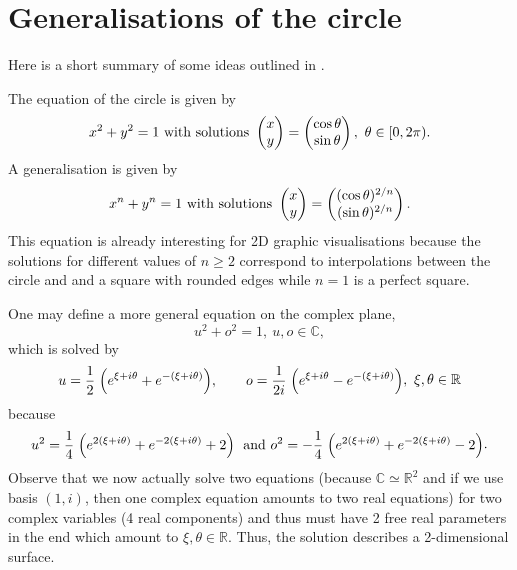 \section{Generalisations of the circle}

Here is a short summary of some ideas outlined in \cite{Hanson1994}.

The equation of the circle is given by
\begin{equation}
  x^2+y^2 = 1 \text{ with solutions }
  \begin{pmatrix}
    x\\
    y
  \end{pmatrix} =
  \begin{pmatrix}
    \cos \theta\\
    \sin \theta
  \end{pmatrix},~\theta \in [0,2\pi).
  \label{eq:circle}
\end{equation}
A generalisation is given by
\begin{equation}
  x^n+y^n = 1 \text{ with solutions }
  \begin{pmatrix}
    x\\
    y
  \end{pmatrix} =
  \begin{pmatrix}
    (\cos \theta)^{2/n}\\
  (\sin \theta)^{2/n}
\end{pmatrix}.
  \label{eq:generalRealCircle}
\end{equation}
This equation is already interesting for 2D graphic visualisations because
the solutions for different values of $n\ge 2$ correspond to interpolations between
the circle and and a square with rounded edges while $n=1$ is a perfect square.

One may define a more general equation on the complex plane,
\begin{equation}
  u^2+o^2 = 1,~u,o\in\mathbb{C},
\end{equation}
which is solved by
\begin{equation}
  \begin{split}
    u = \frac{1}{2}\mathrel{ \left(e^{\xi+i\theta}+e^{-(\xi+i\theta)}\right) },\qquad
  o = \frac{1}{2i}\mathrel{ \left(e^{\xi+i\theta}-e^{-(\xi+i\theta)}\right) }
\end{split},~\xi,\theta\in\mathbb{R}
  \label{eq:complexCircle}
\end{equation}
because
\begin{equation*}
  \begin{split}
    u^2 = \frac{1}{4}
    \mathrel{ \left(e^{2(\xi+i\theta)}+e^{-2(\xi+i\theta)}+2\right) } \text{ and }
    o^2 = -\frac{1}{4}
    \mathrel{ \left(e^{2(\xi+i\theta)}+e^{-2(\xi+i\theta)}-2\right) }
  \end{split}.
\end{equation*}
Observe that we now actually solve two equations
(because $\mathbb{C}\simeq \mathbb{R}^2$ and if we use basis $(1,i)$, then one complex equation
amounts to two real equations) for two complex variables (4 real components)
and thus must have 2 free real parameters in the end which amount to $\xi,\theta\in \mathbb{R}$.
Thus, the solution describes a 2-dimensional surface.\\

